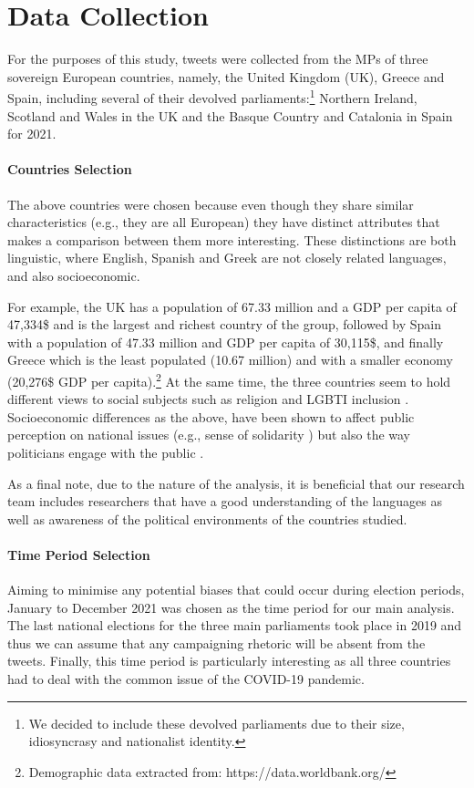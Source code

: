 \section{Data Collection}
\label{sec:datacollect}
For the purposes of this study, tweets were collected from the \acp{MP} of three 
sovereign European countries, namely, the United Kingdom (UK),  Greece and Spain, including several of their devolved parliaments:\footnote{We decided to include these devolved parliaments due to their size, idiosyncrasy and nationalist identity.}
Northern Ireland, Scotland and Wales in the UK and the Basque Country and Catalonia in Spain for 2021.


\paragraph{Countries Selection} The above countries were chosen because even though they share similar characteristics (e.g., they are all European) they have distinct attributes that makes a comparison between them more interesting. These distinctions are both linguistic, where English, Spanish and Greek are not closely related languages, and also socioeconomic.

For example, the UK has a population of 67.33 million and a GDP per capita of 47,334\$ and is the largest and richest country of the group, followed by Spain with a population of 47.33 million and GDP per capita of 30,115\$, and finally Greece which is the least populated (10.67 million) and with a smaller economy (20,276\$ GDP per capita).\footnote{Demographic data extracted from: https://data.worldbank.org/} At the same time, the three countries seem to hold different views to social subjects such as religion \cite{pew2018religious} and LGBTI inclusion \cite{flores2021social}. Socioeconomic differences as the above, have been shown to affect public perception on national issues (e.g., sense of solidarity \cite{vasilopoulou2020poor}) but also the way politicians engage with the public \cite{brown2017politics}.

As a final note, due to the nature of the analysis, it is beneficial that our research team includes researchers that have a good understanding of the languages as well as awareness of the political environments of the countries studied.

\paragraph{Time Period Selection} Aiming to minimise any potential biases that could occur during election periods, January to December 2021 was chosen as the time period for our main analysis. The last national elections for the three main parliaments took place in 2019 and thus we can assume that any campaigning rhetoric will be absent from the tweets. Finally, this time period is particularly interesting as all three countries had to deal with the common issue of the COVID-19 pandemic. 

